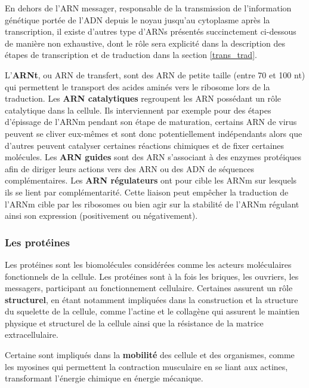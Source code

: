 En dehors de l'ARN messager, responsable de la transmission de l'information génétique portée de l'ADN depuis le noyau jusqu'au cytoplasme après la transcription, il existe d'autres type  d'ARNs présentés succinctement ci-dessous de manière non exhaustive, dont le rôle sera explicité dans la description des étapes de transcription et de traduction dans la section \ref{trans_trad}.

L'\textbf{ARNt}, ou ARN de transfert, sont des ARN de petite taille (entre 70 et 100 nt) qui permettent le transport des acides aminés vers le ribosome lors de la traduction.
Les \textbf{ARN catalytiques} regroupent les ARN possédant un rôle catalytique dans la cellule. Ils interviennent par exemple pour des étapes d'épissage de l'ARNm pendant son étape de maturation, certains ARN de virus peuvent se cliver eux-mêmes et sont donc potentiellement indépendants alors que d'autres peuvent catalyser certaines réactions chimiques et de fixer certaines molécules.
Les \textbf{ARN guides} sont des ARN s'associant à des enzymes protéiques afin de diriger leurs actions vers des ARN ou des ADN de séquences complémentaires.
Les \textbf{ARN régulateurs} ont pour cible les ARNm sur lesquels ils se lient par complémentarité. Cette liaison peut empêcher la traduction de l'ARNm cible par les ribosomes ou bien agir sur la stabilité de l'ARNm régulant ainsi son expression (positivement ou négativement).

\subsubsection{Les protéines}

Les protéines sont les biomolécules considérées comme les acteurs moléculaires fonctionnels de la cellule. Les protéines sont à la fois les briques, les ouvriers, les messagers, participant au fonctionnement cellulaire. Certaines assurent un rôle \textbf{structurel}, en étant notamment impliquées dans la construction et la structure du squelette de la cellule, comme l'actine et le collagène qui assurent le maintien physique et structurel de la cellule ainsi que la résistance de la matrice extracellulaire. 


Certaine sont impliqués dans la \textbf{mobilité} des cellule et des organismes, comme les myosines qui permettent la contraction musculaire en se liant aux actines, transformant l'énergie chimique en énergie mécanique. 


